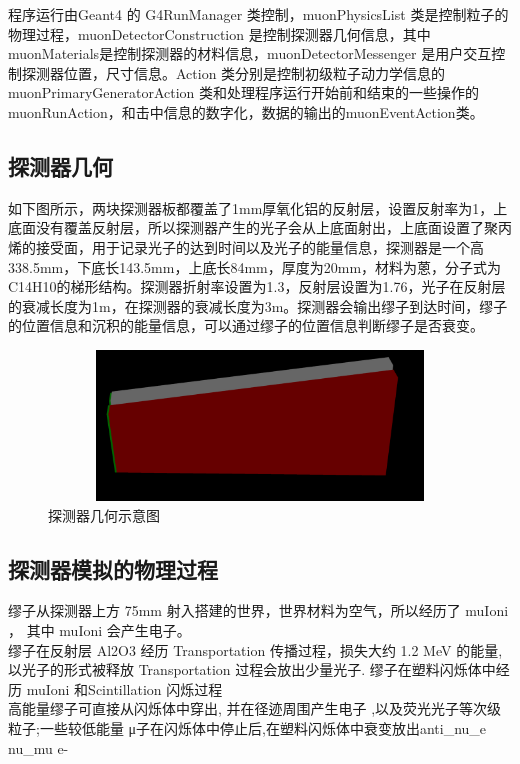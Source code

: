 \documentclass[UTF8]{ctexart}
\begin{document}
程序运行由Geant4 的 G4RunManager 类控制，muonPhysicsList 类是控制粒子的物理过程，muonDetectorConstruction 是控制探测器几何信息，其中 muonMaterials是控制探测器的材料信息，muonDetectorMessenger 是用户交互控制探测器位置，尺寸信息。Action 类分别是控制初级粒子动力学信息的 muonPrimaryGeneratorAction 类和处理程序运行开始前和结束的一些操作的 muonRunAction，和击中信息的数字化，数据的输出的muonEventAction类。

\subsection{探测器几何}

如下图所示，两块探测器板都覆盖了1mm厚氧化铝的反射层，设置反射率为1，上底面没有覆盖反射层，所以探测器产生的光子会从上底面射出，上底面设置了聚丙烯的接受面，用于记录光子的达到时间以及光子的能量信息，探测器是一个高338.5mm，下底长143.5mm，上底长84mm，厚度为20mm，材料为蒽，分子式为C14H10的梯形结构。探测器折射率设置为1.3，反射层设置为1.76，光子在反射层的衰减长度为1m，在探测器的衰减长度为3m。探测器会输出缪子到达时间，缪子的位置信息和沉积的能量信息，可以通过缪子的位置信息判断缪子是否衰变。

\begin{figure}[h]
    \centering\includegraphics[width=120mm,height=40mm]{pic/muonde.png}
    \caption{探测器几何示意图}
\end{figure}

\subsection{探测器模拟的物理过程}

缪子从探测器上方 75mm 射入搭建的世界，世界材料为空气，所以经历了 muIoni ， 其中 muIoni 会产生电子。\\

缪子在反射层 Al2O3 经历 Transportation 传播过程，损失大约 1.2 MeV 的能量, 以光子的形式被释放 Transportation 过程会放出少量光子. 缪子在塑料闪烁体中经历 muIoni 和Scintillation 闪烁过程\\

高能量缪子可直接从闪烁体中穿出, 并在径迹周围产生电子 ,以及荧光光子等次级粒子;一些较低能量 μ子在闪烁体中停止后,在塑料闪烁体中衰变放出anti\_nu\_e  nu\_mu  e-\\
\end{document}
